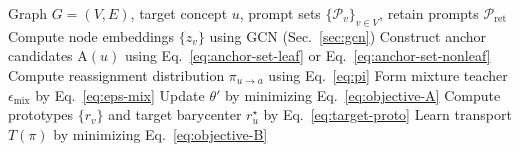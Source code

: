 \begin{algorithm}[t]
\caption{Probabilistic Concept Reassignment via Graph-Guided Anchors}
\label{alg:main}
\begin{algorithmic}[1]
\REQUIRE Graph $G=(V,E)$, target concept $u$, prompt sets $\{\mathcal{P}_v\}_{v\in V}$, retain prompts $\mathcal{P}_{\mathrm{ret}}$
\STATE Compute node embeddings $\{z_v\}$ using GCN (Sec.~\ref{sec:gcn})
\STATE Construct anchor candidates $\mathrm{A}(u)$ using Eq.~\eqref{eq:anchor-set-leaf} or Eq.~\eqref{eq:anchor-set-nonleaf}
\STATE Compute reassignment distribution $\pi_{u\rightarrow a}$ using Eq.~\eqref{eq:pi}
    \STATE Form mixture teacher $\epsilon_{\mathrm{mix}}$ by Eq.~\eqref{eq:eps-mix}
    \STATE Update $\theta'$ by minimizing Eq.~\eqref{eq:objective-A}
\ELSE
    \STATE Compute prototypes $\{r_v\}$ and target barycenter $r_u^\star$ by Eq.~\eqref{eq:target-proto}
    \STATE Learn transport $T(\pi)$ by minimizing Eq.~\eqref{eq:objective-B}
\ENDIF
\end{algorithmic}
\end{algorithm}

